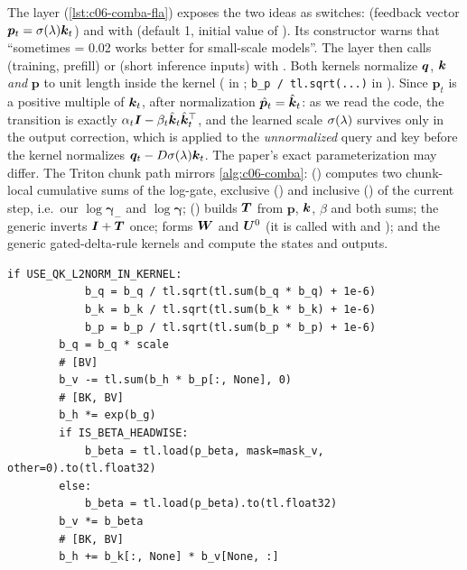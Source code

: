 \begin{implnote}[title={In the code: the maintained \fla{} version}]
The \fla{} layer (\cref{lst:c06-comba-fla}) exposes the two ideas as switches:
 (feedback vector $\bm{p}_t=\sigma(\lambda)\bm{k}_t$) and
 with  (default 1, initial value of
). Its constructor warns that ``sometimes  = 0.02 works better
for small-scale models''. The layer then calls  (training, prefill) or
 (short inference inputs) with .
Both kernels normalize $\bm{q}$, $\bm{k}$ \emph{and} $\bm{p}$ to unit length inside the kernel
( in ; \texttt{b\_p / tl.sqrt(...)} in
). Since $\bm{p}_t$ is a positive multiple of $\bm{k}_t$, after
normalization $\hat{\bm{p}}_t=\hat{\bm{k}}_t$: as we read the code, the transition is exactly
$\alpha_t\bm{I}-\beta_t\hat{\bm{k}}_t\hat{\bm{k}}_t^{\top}$, and the learned scale $\sigma(\lambda)$ survives
only in the output correction, which is applied to the \emph{unnormalized} query and key
before the kernel normalizes $\bm{q}_t-D\sigma(\lambda)\bm{k}_t$. The paper's exact
parameterization may differ. The Triton chunk path  mirrors \cref{alg:c06-comba}:
 () computes two chunk-local
cumulative sums of the log-gate, exclusive () and inclusive () of the current
step, i.e.\ our $\log\bm{\gamma}_-$ and $\log\bm{\gamma}$;
 () builds $\bm{T}$ from $\bm{p}$,
$\bm{k}$, $\beta$ and both sums; the generic  inverts $\bm{I}+\bm{T}$ once;
 forms $\bm{W}$ and $\bm{U}^0$ (it is called with  and
); and the generic gated-delta-rule kernels
 and  compute the states and outputs.
\end{implnote}

\begin{lstlisting}[caption={Excerpt from \texttt{repos/\allowbreak{}fla-org\_\_flash-linear-attention/\allowbreak{}fla/\allowbreak{}ops/\allowbreak{}comba/\allowbreak{}fused\_recurrent.py}},label={lst:c06-comba-kernel}]
        if USE_QK_L2NORM_IN_KERNEL:
            b_q = b_q / tl.sqrt(tl.sum(b_q * b_q) + 1e-6)
            b_k = b_k / tl.sqrt(tl.sum(b_k * b_k) + 1e-6)
            b_p = b_p / tl.sqrt(tl.sum(b_p * b_p) + 1e-6)
        b_q = b_q * scale
        # [BV]
        b_v -= tl.sum(b_h * b_p[:, None], 0)
        # [BK, BV]
        b_h *= exp(b_g)
        if IS_BETA_HEADWISE:
            b_beta = tl.load(p_beta, mask=mask_v, other=0).to(tl.float32)
        else:
            b_beta = tl.load(p_beta).to(tl.float32)
        b_v *= b_beta
        # [BK, BV]
        b_h += b_k[:, None] * b_v[None, :]
\end{lstlisting}

